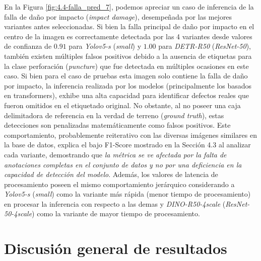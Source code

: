 En la Figura \ref{fig:4.4-falla_pred_7}, podemos apreciar un caso de inferencia de la falla de daño por impacto (\textit{impact damage}), desempeñada por las mejores variantes antes seleccionadas. Si bien la falla principal de daño por impacto en el centro de la imagen es correctamente detectada por las 4 variantes desde valores de confianza de $0.91$ para \textit{Yolov5-s} (\textit{small}) y $1.00$ para \textit{DETR-R50} (\textit{ResNet-50}), también existen múltiples falsos positivos debido a la ausencia de etiquetas para la clase perforación (\textit{puncture}) que fue detectada en múltiples ocasiones en este caso. Si bien para el caso de pruebas esta imagen solo contiene la falla de daño por impacto, la inferencia realizada por los modelos (principalmente los basados en transformers), exhibe una alta capacidad para identificar defectos reales que fueron omitidos en el etiquetado original. No obstante, al no poseer una caja delimitadora de referencia en la verdad de terreno (\textit{ground truth}), estas detecciones son penalizadas matemáticamente como falsos positivos. Este comportamiento, probablemente reiterativo con las diversas imágenes similares en la base de datos, explica el bajo F1-Score mostrado en la Sección 4.3 al analizar cada variante, demostrando que \textit{la métrica se ve afectada por la falta de anotaciones completas en el conjunto de datos y no por una deficiencia en la capacidad de detección del modelo}. Además, los valores de latencia de procesamiento poseen el mismo comportamiento jerárquico considerando a \textit{Yolov5-s} (\textit{small}) como la variante más rápida (menor tiempo de procesamiento) en procesar la inferencia con respecto a las demas y \textit{DINO-R50-4scale} (\textit{ResNet-50-4scale}) como la variante de mayor tiempo de procesamiento.








\clearpage


\section{Discusión general de resultados}

